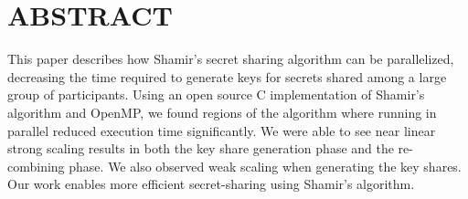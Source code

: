 \documentclass[main.tex]{subfiles}
\begin{document}
\section{ABSTRACT} \label{sec1}

\indent This paper describes how Shamir's secret sharing algorithm can be parallelized, decreasing the time required to generate keys for secrets shared among a large group of participants. Using an open source C implementation of Shamir's algorithm and OpenMP, we found regions of the algorithm where running in parallel reduced execution time significantly. We were able to see near linear strong scaling results in both the key share generation phase and the re-combining phase. We also observed weak scaling when generating the key shares. Our work enables more efficient secret-sharing using Shamir's algorithm.
\end{document}
